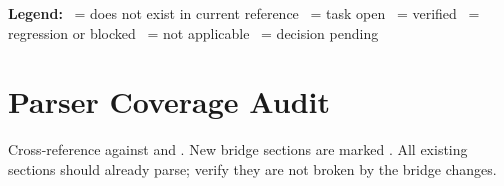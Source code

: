 \documentclass[11pt, a4paper]{article}
\begin{document}
\begin{infobox}
  \small\sffamily
  \textbf{Legend:}\quad
  \snew\ = does not exist in current reference \quad
  \spend\ = task open \quad
  \spass\ = verified \quad
  \sfail\ = regression or blocked \quad
  \sna\ = not applicable \quad
  \stbd\ = decision pending
\end{infobox}

\section{Parser Coverage Audit}

Cross-reference against  and .
New bridge sections are marked \snew. All existing sections should already parse; verify
they are not broken by the bridge changes.
\end{document}
